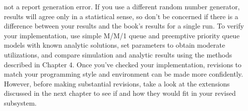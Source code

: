 \noindent not a report generation error. If you use a different random number generator,
results will agree only in a statistical sense, so don't be concerned if there is a
difference between your results and the book's results for a single run. To
verify your implementation, use simple M/M/1 queue and preemptive priority
queue models with known analytic solutions, set parameters to obtain
moderate utilizations, and compare simulation and analytic results using the
methods described in Chapter 4. Once you've checked your implementation,
revisions to match your programming style and environment can be made
more confidently. However, before making substantial revisions, take a look
at the extensions discussed in the next chapter to see if and how they would
fit in your revised subsystem.
